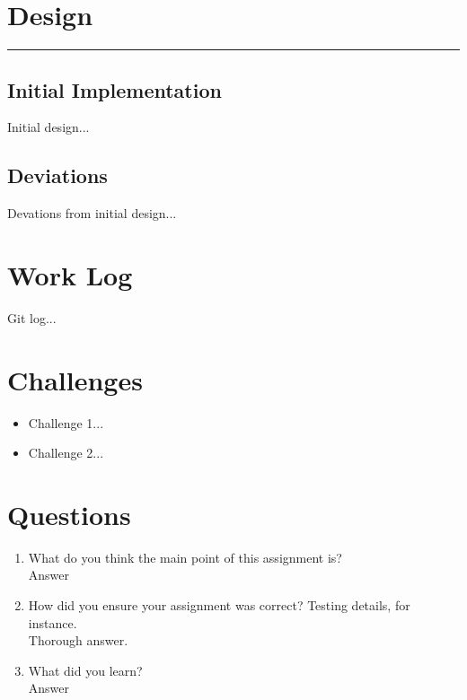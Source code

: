 \documentclass[fleqn,10pt,titlepage]{article}
\begin{document}
\section{Design}
\hrule
\subsection{Initial Implementation}
Initial design...

\subsection{Deviations}
Devations from initial design...
\clearpage

\section{Work Log}
Git log...
\clearpage

\section{Challenges}
\begin{itemize}
\item Challenge 1...
\item Challenge 2...
\end{itemize}
\clearpage

\section{Questions}
\begin{enumerate}
\item What do you think the main point of this assignment is? \\ Answer
\item How did you ensure your assignment was correct? Testing details, for instance. \\ Thorough answer.
\item What did you learn? \\ Answer
\end{enumerate}
\end{document}
